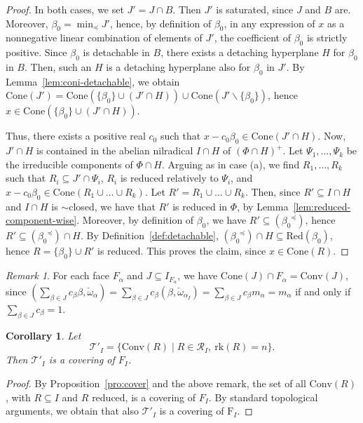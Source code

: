 \documentclass[10pt]{amsart}
\newtheorem{cor}[thm]{Corollary}
\theoremstyle{definition}
\theoremstyle{remark}
\newtheorem{rem}[thm]{Remark}
\newcommand\mc{\mathcal}
\newcommand\smeno{\smallsetminus}
\newcommand\conv{\mathrm{Conv}}
\newcommand\cone{\mathrm{Cone}}
\newcommand\rk{\mathrm{rk}}
\newcommand\al{\alpha}
\newcommand\be{\beta}
\newcommand\red{\mathrm{Red}}
\newcommand\preq{\preccurlyeq}
\begin{document}
\begin{proof}
\par
In both cases, we set $J'=J\cap B$.
Then $J'$ is saturated, since $J$ and $B$ are. 
Moreover, $\be_0=\min_\preq J'$, hence, by definition of $\be_0$, in any expression of $x$ as a nonnegative linear combination of elements of $J'$, the coefficient of $\be_0$ is strictly positive. 
Since $\be_0$ is detachable in $B$, there exists a  detaching  hyperplane $H$ for $\be_0$ in $B$.
Then, such an $H$ is a detaching hyperplane also for $\be_0$ in $J'$. 
By Lemma~\ref{lem:coni-detachable}, we obtain  $\cone(J')=\cone (\{\be_0\}\cup (J'\cap H))\cup \cone(J'\smeno\{\be_0\})$, hence $x\in \cone (\{\be_0\}\cup (J'\cap H))$.

\par
Thus, there exists a positive real $c_0$ such that  $x-c_0\be_0 \in \cone(J'\cap H)$. 
Now, $J'\cap H$ is contained in the abelian nilradical $I\cap H$ of  $(\Phi\cap  H)^+$.
Let $\Psi_1, \dots, \Psi_k$ be the irreducible components of $\Phi\cap  H$.
Arguing as in case (a), we find  $R_1, \dots, R_k$ such that  $R_i\subseteq J'\cap \Psi_i$, $R_i$ is reduced relatively to $\Psi_i$, and  $x-c_0\be_0 \in \cone(R_1\cup\dots\cup  R_k)$.
Let $R'=R_1\cup\dots\cup  R_k$. 
Then, since $R'\subseteq I\cap H$ and $I\cap H$ is $\sim$closed, we have that $R'$ is reduced in $\Phi$, by Lemma~\ref{lem:reduced-component-wise}.
Moreover, by definition of $\be_0$, we have $R'\subseteq ({\be_0}^\preq)$, hence $R'\subseteq({\be_0}^\preq)\cap H$. 
By Definition~\ref{def:detachable}, $({\be_0}^\preq)\cap H\subseteq \red(\be_0)$, hence 
$R=\{\be_0\}\cup R'$ is reduced. 
This proves the claim, since $x\in \cone(R)$. 
\end{proof}


\begin{rem}\label{rem:cone-conv}
For each face $F_\al$ and $J\subseteq I_{F_\al}$, we have $\cone(J)\cap F_\al=\conv(J)$, since $(\sum\limits_{\be\in J} c_\be \be, \check \omega_{\al})=\sum\limits_{\be\in J} c_\be(\be, \check \omega_{\al_I})=\sum\limits_{\be\in J} c_\be m_\al=m_\al$ if and only if $\sum\limits_{\be\in J} c_\be=1$.
\end{rem}


\begin{cor}\label{cor:cover}
Let 
$$
\mc T'_I=\{\conv(R)\mid R \in \mc R_I, \ \rk(R)=n\}.
$$
Then $\mc T'_I$ is a covering of $F_I$.
\end{cor}

\begin{proof}
By Proposition~\ref{pro:cover} and the above remark, the set of all $\conv(R)$, with $R \subseteq I$ and $R$ reduced, is a covering of $F_I$. 
By standard topological arguments, we obtain that also $\mc T'_I$ is a covering  of $\mathrm F_I$.
\end{proof}
\end{document}
